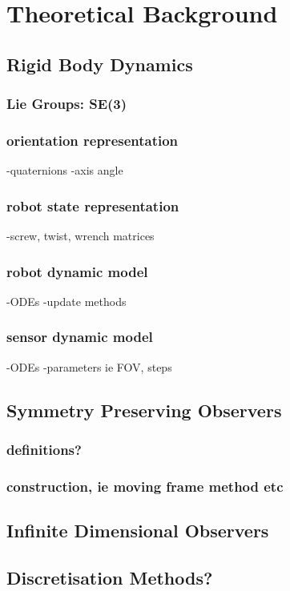 \section{Theoretical Background}

\subsection{Rigid Body Dynamics}
	\subsubsection{Lie Groups: SE(3)}
	\subsubsection{orientation representation}
		-quaternions
		-axis angle
	\subsubsection{robot state representation}	
		-screw, twist, wrench matrices
	\subsubsection{robot dynamic model}
		-ODEs
		-update methods
	\subsubsection{sensor dynamic model}
		-ODEs
		-parameters ie FOV, steps
\subsection{Symmetry Preserving Observers}
	\subsubsection{definitions?}
	\subsubsection{construction, ie moving frame method etc}
\subsection{Infinite Dimensional Observers}
\subsection{Discretisation Methods?}